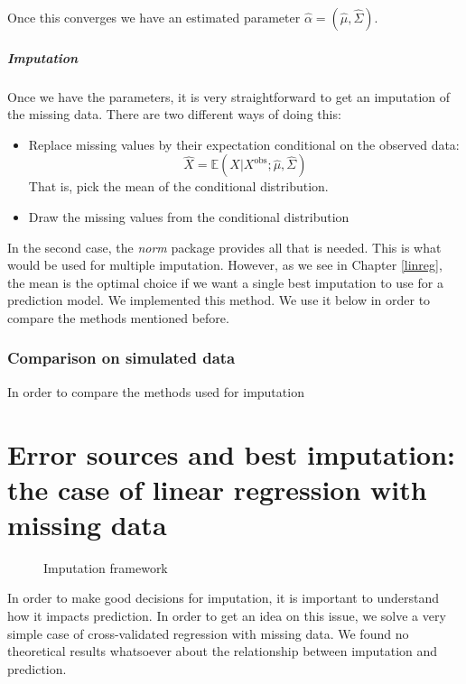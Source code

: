 \documentclass[12pt, a4paper]{memoir}
\begin{document}
Once this converges we have an estimated parameter $\hat{\alpha} = (\hat{\mu}, \hat{\Sigma})$.

\paragraph{Imputation}
Once we have the parameters, it is very straightforward to get an imputation of the missing data. There are two different ways of doing this:
\begin{itemize}
\item Replace missing values by their expectation conditional on the observed data: 
$$\hat{X} = \mathbb{E}(X \vert X^{\text{obs}} ; \hat{\mu}, \hat{\Sigma})$$
That is, pick the mean of the conditional distribution.
\item Draw the missing values from the conditional distribution
\end{itemize}

In the second case, the \emph{norm} package provides all that is needed. This is what would be used for multiple imputation. However, as we see in Chapter \ref{linreg}, the mean is the optimal choice if we want a single best imputation to use for a prediction model. We implemented this method. We use it below in order to compare the methods mentioned before.

		\subsection{Comparison on simulated data}
In order to compare the methods used for imputation
		

		
\chapter{Error sources and best imputation: the case of linear regression with missing data}
\begin{figure}
  \caption{Imputation framework}
  \label{fig:tikz:imp}
\end{figure}

In order to make good decisions for imputation, it is important to understand how it impacts prediction. In order to get an idea on this issue, we solve a very simple case of cross-validated regression with missing data. We found no theoretical results whatsoever about the relationship between imputation and prediction. 
\label{linreg}
\end{document}
